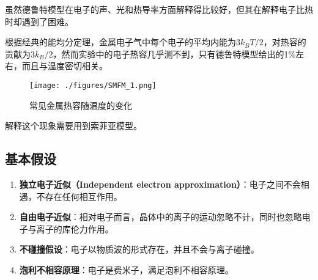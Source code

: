 
虽然德鲁特模型在电子的声、光和热导率方面解释得比较好，但其在解释电子比热时却遇到了困难。

根据经典的能均分定理，金属电子气中每个电子的平均内能为$3k_BT/2$，对热容的贡献为$3k_B/2$，然而实验中的电子热容几乎测不到，只有德鲁特模型给出的1\%左右，而且与温度密切相关。
\begin{figure}[ht]
\centering
\texttt{[image: ./figures/SMFM\_1.png]}
\caption{常见金属热容随温度的变化} \label{SMFM_fig1}
\end{figure}
解释这个现象需要用到索菲亚模型。
\subsection{基本假设}
\begin{enumerate}
\item \textbf{独立电子近似（Independent electron approximation）}：电子之间不会相遇，不存在任何相互作用。
\item \textbf{自由电子近似}：相对电子而言，晶体中的离子的运动忽略不计，同时也忽略电子与离子的库伦力作用。
\item \textbf{不碰撞假设}：电子以物质波的形式存在，并且不会与离子碰撞。
\item \textbf{泡利不相容原理}：电子是费米子，满足泡利不相容原理。
\end{enumerate}

